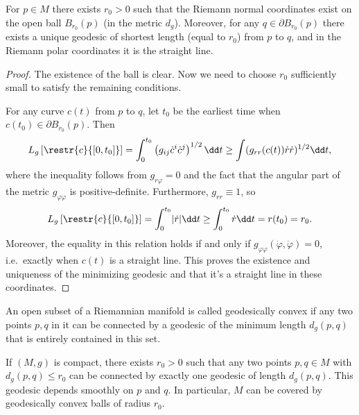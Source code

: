 \begin{cor}
    For $p\in M$ there exists $r_0>0$ such that the Riemann normal coordinates exist on the open ball $B_{r_0}(p)$ (in the metric $d_g$). Moreover, for any $q\in \partial B_{r_0}(p)$ there exists a unique geodesic of shortest length (equal to $r_0$) from $p$ to $q$, and in the Riemann polar coordinates it is the straight line.
\end{cor}
\begin{proof}
    The existence of the ball is clear. Now we need to choose $r_0$ sufficiently small to satisfy the remaining conditions.
    
    For any curve $c(t)$ from $p$ to $q$, let $t_0$ be the earliest time when $c(t_0)\in \partial B_{r_0}(p)$. Then
    \[L_g\left[\restr{c}{[0,t_0]}\right]=\int_0^{t_0} \left(g_{ij}\dot c^i\dot c^j\right)^{1/2}\dd t\geq \int (g_{rr}(c(t))\dot r\dot r)^{1/2}\dd t,\]
    where the inequality follows from $g_{r\varphi}=0$ and the fact that the angular part of the metric $g_{\varphi\varphi}$ is positive-definite. Furthermore, $g_{rr}\equiv1$, so
    \[L_g\left[\restr{c}{[0,t_0]}\right]=\int_0^{t_0}\lvert \dot r\rvert\dd t\geq \int_0^{t_0}\dot r\dd t=r(t_0)=r_0.\]
    Moreover, the equality in this relation holds if and only if $g_{\varphi\varphi}(\dot\varphi,\dot\varphi)=0$, i.e.\ exactly when $c(t)$ is a straight line. This proves the existence and uniqueness of the minimizing geodesic and that it's a straight line in these coordinates.
\end{proof}

\begin{defn}
    An open subset of a Riemannian manifold is called geodesically convex if any two points $p,q$ in it can be connected by a geodesic of the minimum length $d_g(p,q)$ that is entirely contained in this set.
\end{defn}

\begin{cor}
    If $(M,g)$ is compact, there exists $r_0>0$ such that any two points $p,q\in M$ with $d_g(p,q)\leq r_0$ can be connected by exactly one geodesic of length $d_g(p,q)$. This geodesic depends smoothly on $p$ and $q$. In particular, $M$ can be covered by geodesically convex balls of radius $r_0$.
\end{cor}

